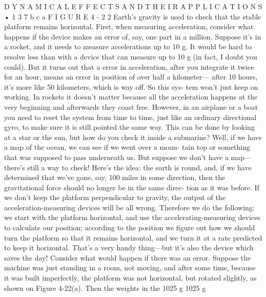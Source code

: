 \documentclass[10pt,oneside]{article}
\begin{document}
D Y N A M I C A L  E F F E C T S  A N D  T H E I R  A P P L I C A T I O N S • 1 3 7 b c a F I G U R E  4 - 2 2 Earth’s gravity is used to check that the stable platform remains horizontal. First, when measuring acceleration, consider what happens if the device makes an error of, say, one part in a million. Suppose it’s in a rocket, and it needs to measure accelerations up to 10 g. It would be hard to resolve less than with a device that can measure up to 10 g (in fact, I doubt you could). But it turns out that a error in acceleration, after you integrate it twice for an hour, means an error in position of over half a kilometer--- after 10 hours, it’s more like 50 kilometers, which is way off. So this sys- tem won’t just keep on working. In rockets it doesn’t matter because all the acceleration happens at the very beginning and afterwards they coast free. However, in an airplane or a boat you need to reset the system from time to time, just like an ordinary directional gyro, to make sure it is still pointed the same way. This can be done by looking at a star or the sun, but how do you check it inside a submarine? Well, if we have a map of the ocean, we can see if we went over a moun- tain top or something that was supposed to pass underneath us. But suppose we don’t have a map---there’s still a way to check! Here’s the idea: the earth is round, and, if we have determined that we’ve gone, say, 100 miles in some direction, then the gravitational force should no longer be in the same direc- tion as it was before. If we don’t keep the platform perpendicular to gravity, the output of the acceleration-measuring devices will be all wrong. Therefore we do the following: we start with the platform horizontal, and use the accelerating-measuring devices to calculate our position; according to the position we figure out how we should turn the platform so that it remains horizontal, and we turn it at a rate predicted to keep it horizontal. That’s a very handy thing---but it’s also the device which saves the day! Consider what would happen if there was an error. Suppose the machine was just standing in a room, not moving, and after some time, because it was built imperfectly, the platform was not horizontal, but rotated slightly, as shown on Figure 4-22(a). Then the weights in the 1025 g 1025 g\par
\end{document}

